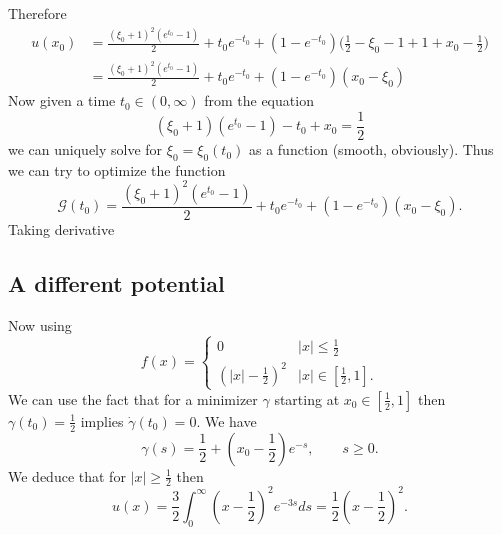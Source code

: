 \documentclass[english,reqno]{amsart}
\begin{document}
Therefore
\begin{equation*}
\begin{split}
    u(x_0) &= \frac{(\xi_0+1)^2(e^{t_0}-1)}{2} +t_0e^{-t_0} + (1-e^{-t_0})\Bigg(\frac{1}{2}-\xi_0-1 +1+x_0-\frac{1}{2} \Bigg)\\
    &= \frac{(\xi_0+1)^2(e^{t_0}-1)}{2} + t_0e^{-t_0} + (1-e^{-t_0})(x_0-\xi_0)
\end{split}
\end{equation*}
Now given a time $t_0\in (0,\infty)$ from the equation
\begin{equation*}
    (\xi_0+1)(e^{t_0}-1) - t_0 + x_0 = \frac{1}{2}
\end{equation*}
we can uniquely solve for $\xi_0 = \xi_0(t_0)$ as a function (smooth, obviously). Thus we can try to optimize the function
\begin{equation*}
    \mathcal{G}(t_0) =\frac{(\xi_0+1)^2(e^{t_0}-1)}{2} + t_0e^{-t_0} + (1-e^{-t_0})(x_0-\xi_0).
\end{equation*}
Taking derivative


\subsection{A different potential}
Now using 
\begin{equation*}
    f(x) = \begin{cases}
    0 & |x|\leq \frac{1}{2}\\
    \left(|x|-\frac{1}{2}\right)^2 & |x|\in \left[\frac{1}{2},1\right].
    \end{cases}
\end{equation*}
We can use the fact that for a minimizer $\gamma$ starting at $x_0\in \left[\frac{1}{2},1\right]$ then $\gamma(t_0) = \frac{1}{2}$ implies $\dot{\gamma}(t_0) = 0$. We have
\begin{equation*}
    \displaystyle \gamma (s) = \frac{1}{2}+\left( x_0 -\frac{1}{2}\right) e^{-s},\qquad s\geq 0.
\end{equation*}
We deduce that for $|x|\geq \frac{1}{2}$ then
\begin{equation*}
    u(x) = \frac{3}{2}\int_0^\infty  \left(x-\frac{1}{2}\right)^2e^{
    -3s}ds = \frac{1}{2}\left(x-\frac{1}{2}\right)^2.
\end{equation*}
\end{document}
